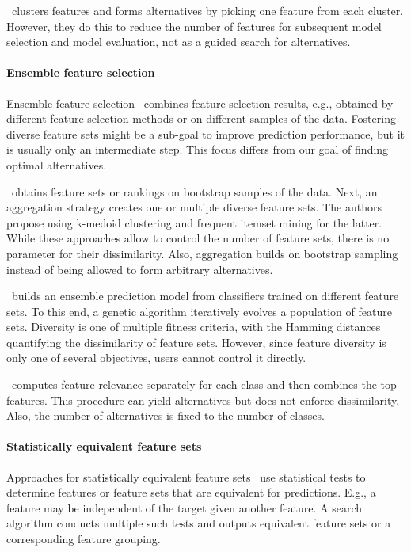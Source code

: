 \documentclass{article}
\theoremstyle{definition}
\begin{document}
\cite{mueller2021feature}~clusters features and forms alternatives by picking one feature from each cluster.
However, they do this to reduce the number of features for subsequent model selection and model evaluation, not as a guided search for alternatives.

\paragraph{Ensemble feature selection}

Ensemble feature selection~\cite{saeys2008robust, seijo2017ensemble} combines feature-selection results, e.g., obtained by different feature-selection methods or on different samples of the data.
Fostering diverse feature sets might be a sub-goal to improve prediction performance, but it is usually only an intermediate step.
This focus differs from our goal of finding optimal alternatives.

\cite{woznica2012model}~obtains feature sets or rankings on bootstrap samples of the data.
Next, an aggregation strategy creates one or multiple diverse feature sets.
The authors propose using k-medoid clustering and frequent itemset mining for the latter.
While these approaches allow to control the number of feature sets, there is no parameter for their dissimilarity.
Also, aggregation builds on bootstrap sampling instead of being allowed to form arbitrary alternatives.

\cite{liu2019subspace}~builds an ensemble prediction model from classifiers trained on different feature sets.
To this end, a genetic algorithm iteratively evolves a population of feature sets.
Diversity is one of multiple fitness criteria, with the Hamming distances quantifying the dissimilarity of feature sets.
However, since feature diversity is only one of several objectives, users cannot control it directly.

\cite{guru2018alternative}~computes feature relevance separately for each class and then combines the top features.
This procedure can yield alternatives but does not enforce dissimilarity.
Also, the number of alternatives is fixed to the number of classes.

\paragraph{Statistically equivalent feature sets}

Approaches for statistically equivalent feature sets~\cite{borboudakis2021extending, lagani2017feature} use statistical tests to determine features or feature sets that are equivalent for predictions.
E.g., a feature may be independent of the target given another feature.
A search algorithm conducts multiple such tests and outputs equivalent feature sets or a corresponding feature grouping.
\end{document}
